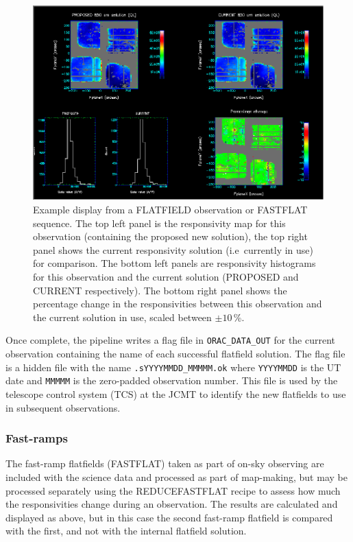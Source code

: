 \documentclass[twoside,11pt]{article}
\renewcommand{\_}{\texttt{\symbol{95}}}
\newcommand{\task}[1]{\textsf{#1}}
\begin{document}
\begin{figure}[t]
\centering
\includegraphics[width=\textwidth]{sun264_flatfield}
\caption{Example display from a FLATFIELD observation or FASTFLAT
  sequence. The top left panel is the responsivity map for this
  observation (containing the proposed new solution), the top right
  panel shows the current responsivity solution (i.e\ currently in
  use) for comparison. The bottom left panels are responsivity
  histograms for this observation and the current solution (PROPOSED
  and CURRENT respectively). The bottom right panel shows the
  percentage change in the responsivities between this observation and
  the current solution in use, scaled between
  $\pm10$\,\%.\label{fig:flatfield}}
\end{figure}

Once complete, the pipeline writes a flag file in
\verb+ORAC_DATA_OUT+ for the current observation containing the name
of each successful flatfield solution. The flag file is a hidden file
with the name \verb+.sYYYYMMDD_MMMMM.ok+ where \verb+YYYYMMDD+ is the
UT date and \verb+MMMMM+ is the zero-padded observation number. This
file is used by the telescope control system (TCS) at the JCMT to
identify the new flatfields to use in subsequent observations.

\subsubsection{Fast-ramps}

The fast-ramp flatfields (FASTFLAT) taken as part of on-sky observing
are included with the science data and processed as part of
map-making, but may be processed separately using the
\task{REDUCE\_FASTFLAT} recipe to assess how much the responsivities
change during an observation. The results are calculated and displayed
as above, but in this case the second fast-ramp flatfield is compared
with the first, and not with the internal flatfield solution.
\end{document}
